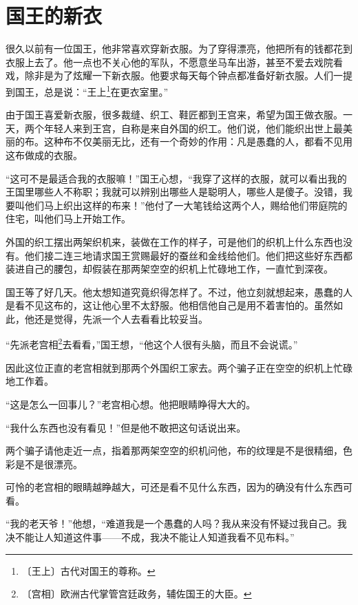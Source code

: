 \documentclass[12pt,UTF-8,openany]{ctexbook}
\begin{document}
\chapter{国王的新衣}

\begin{large}
    
    很久以前有一位国王，他非常喜欢穿新衣服。为了穿得漂亮，他把所有的钱都花到衣服上去了。他一点也不关心他的军队，不愿意坐马车出游，甚至不爱去戏院看戏，除非是为了炫耀一下新衣服。他要求每天每个钟点都准备好新衣服。人们一提到国王，总是说：“王上\footnote{〔王上〕古代对国王的尊称。}在更衣室里。”
    
    由于国王喜爱新衣服，很多裁缝、织工、鞋匠都到王宫来，希望为国王做衣服。一天，两个年轻人来到王宫，自称是来自外国的织工。他们说，他们能织出世上最美丽的布。这种布不仅美丽无比，还有一个奇妙的作用：凡是愚蠢的人，都看不见用这布做成的衣服。
    
    “这可不是最适合我的衣服嘛！”国王心想，“我穿了这样的衣服，就可以看出我的王国里哪些人不称职；我就可以辨别出哪些人是聪明人，哪些人是傻子。没错，我要叫他们马上织出这样的布来！”他付了一大笔钱给这两个人，赐给他们带庭院的住宅，叫他们马上开始工作。
    
    外国的织工摆出两架织机来，装做在工作的样子，可是他们的织机上什么东西也没有。他们接二连三地请求国王赏赐最好的蚕丝和金线给他们。他们把这些好东西都装进自己的腰包，却假装在那两架空空的织机上忙碌地工作，一直忙到深夜。
    
    国王等了好几天。他太想知道究竟织得怎样了。不过，他立刻就想起来，愚蠢的人是看不见这布的，这让他心里不太舒服。他相信他自己是用不着害怕的。虽然如此，他还是觉得，先派一个人去看看比较妥当。
    
    “先派老宫相\footnote{〔宫相〕欧洲古代掌管宫廷政务，辅佐国王的大臣。}去看看，”国王想，“他这个人很有头脑，而且不会说谎。”
    
    因此这位正直的老宫相就到那两个外国织工家去。两个骗子正在空空的织机上忙碌地工作着。
    
    “这是怎么一回事儿？”老宫相心想。他把眼睛睁得大大的。
    
    “我什么东西也没有看见！”但是他不敢把这句话说出来。
    
    两个骗子请他走近一点，指着那两架空空的织机问他，布的纹理是不是很精细，色彩是不是很漂亮。
    
    可怜的老宫相的眼睛越睁越大，可还是看不见什么东西，因为的确没有什么东西可看。
    
    “我的老天爷！”他想，“难道我是一个愚蠢的人吗？我从来没有怀疑过我自己。我决不能让人知道这件事——不成，我决不能让人知道我看不见布料。”
    

\end{large}
\end{document}
